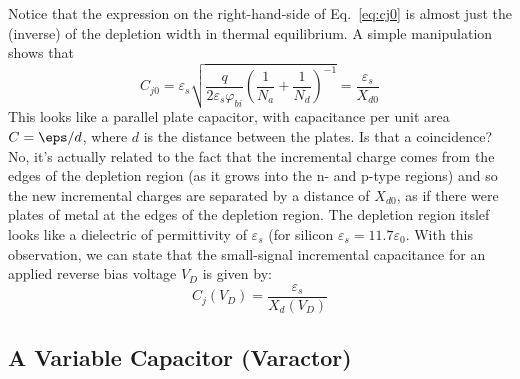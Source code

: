Notice that the expression on the right-hand-side of Eq.~\ref{eq:cj0} is almost just the (inverse) of the depletion width in thermal equilibrium.  A simple manipulation shows that
%
\begin{equation} 
{C_{j0}} = {\varepsilon _s}\sqrt {\frac{q}{{2{\varepsilon _s}{\varphi _{bi}}}}{{\left( {\frac{1}{{{N_a}}} + \frac{1}{{{N_d}}}} \right)}^{ - 1}}}  = \frac{{{\varepsilon _s}}}{{{X_{d0}}}}
\end{equation}
%
This looks like a parallel plate capacitor, with capacitance per unit area $C = \eps/d$, where $d$ is the distance between the plates. Is that a coincidence?  No, it's actually related to the fact that the incremental charge comes from the edges of the depletion region (as it grows into the n- and p-type regions) and so the new incremental charges are separated by a distance of $X_{d0}$, as if there were plates of metal at the edges of the depletion region.  The depletion region itslef looks like a dielectric of permittivity of $\varepsilon_s$ (for silicon $\varepsilon_s = 11.7 \varepsilon_0$.  With this observation, we can state that the small-signal incremental capacitance for an applied reverse bias voltage $V_D$ is given by:
%
\begin{equation} 
C_j^{}({V_D}) = \frac{{{\varepsilon _s}}}{{{X_d}({V_D})}} 
\end{equation}


\subsection{A Variable Capacitor (Varactor)}

